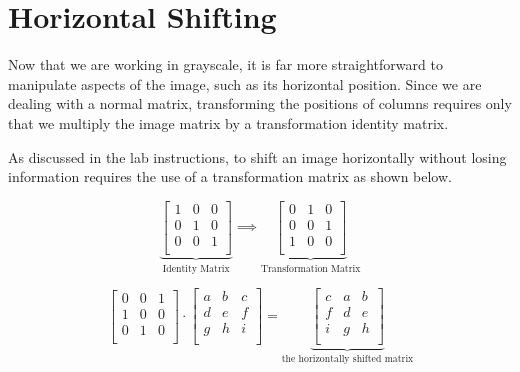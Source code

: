 \section{Horizontal Shifting}

Now that we are working in grayscale, it is far more straightforward to
manipulate aspects of the image, such as its         horizontal position.
Since we are dealing with a normal matrix, transforming the positions of
columns requires only that    we multiply the image matrix by a
transformation identity matrix.

As discussed in the lab instructions, to shift an image horizontally
without
losing information requires the use of a transformation matrix as shown
below.

\[
  \underbrace{
    \begin{bmatrix}
      1&0&0\\
      0&1&0\\
      0&0&1\\
    \end{bmatrix}
  }_{\text{Identity Matrix}}
  \implies
  \underbrace{
    \begin{bmatrix}
      0&1&0\\
      0&0&1\\
      1&0&0\\
    \end{bmatrix}
  }_{\text{Transformation
  Matrix}}
\]

\[ 
  \begin{bmatrix}
    0&0&1\\
    1&0&0\\
    0&1&0\\
  \end{bmatrix}
  \cdot
  \begin{bmatrix}
    a&b&c\\
    d&e&f\\
    g&h&i\\
  \end{bmatrix}
  =
  \underbrace{
    \begin{bmatrix}
      c&a&b\\
      f&d&e\\
      i&g&h\\
    \end{bmatrix}
  }_{\text{the
    horizontally
    shifted
  matrix}}
\]


